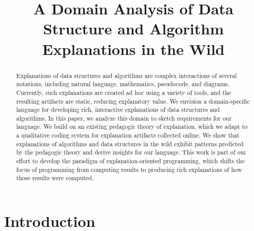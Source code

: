 \documentclass[conference]{IEEEtran}
\begin{document}
\title{A Domain Analysis of Data Structure and Algorithm Explanations in the Wild}



\author{
\IEEEauthorblockA{}
}

\maketitle


\begin{abstract}
Explanations of data structures and algorithms are complex interactions of
several notations, including natural language, mathematics, pseudocode, and
diagrams. Currently, such explanations are created ad hoc using a variety of
tools, and the resulting artifacts are static, reducing explanatory value. We
envision a domain-specific language for developing rich, interactive
explanations of data structures and algorithms. In this paper, we analyze this
domain to sketch requirements for our language. We build on an existing
pedagogic theory of explanation, which we adapt to a qualitative coding system
for explanation artifacts collected online. We show that explanations of
algorithms and data structures in the wild exhibit patterns predicted by the
pedagogic theory and derive insights for our language. This work is part of our
effort to develop the paradigm of explanation-oriented programming, which
shifts the focus of programming from computing results to producing rich
explanations of how those results were computed.
\end{abstract}


\IEEEpeerreviewmaketitle


\section{Introduction}
\label{sec:intro}
\end{document}
